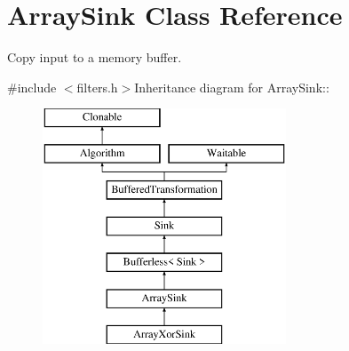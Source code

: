 \hypertarget{class_array_sink}{
\section{ArraySink Class Reference}
\label{class_array_sink}
}


Copy input to a memory buffer.  


{\ttfamily \#include $<$filters.h$>$}Inheritance diagram for ArraySink::\begin{figure}[H]
\begin{center}
\leavevmode
\includegraphics[height=7cm]{class_array_sink}
\end{center}
\end{figure}
